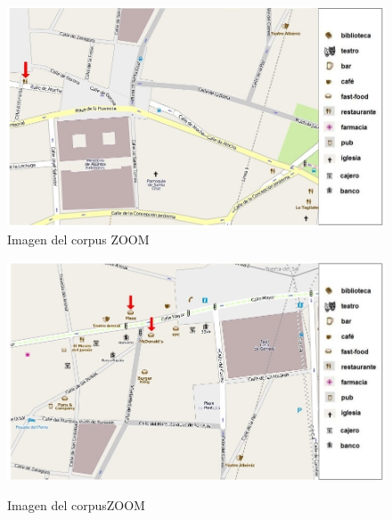 \begin{figure}
\begin{minipage}[b]{0.5\linewidth}
\centering
\includegraphics[width=\textwidth]{images/corpus/mapa17.png}\\[0pt]
\caption{Imagen del corpus ZOOM}
\label{mapa17}
\end{minipage}
\hspace*{0cm}
\begin{minipage}[b]{0.5\linewidth}
\centering
\includegraphics[width=\textwidth]{images/corpus/mapa18.png}\\[0pt]
\caption{Imagen del corpusZOOM}
\label{mapa18}
\end{minipage}
\end{figure}

